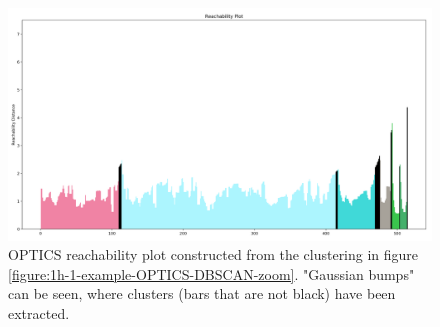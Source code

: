 \begin{figure}[h]
  \centering
  \includegraphics[width=1\textwidth]{./images/OPTICS/1h-1-example-reachabilityPlot-DBSCAN-zoom.png}
  \caption{OPTICS reachability plot constructed from the clustering in figure \ref{figure:1h-1-example-OPTICS-DBSCAN-zoom}. "Gaussian bumps" can be seen, where clusters (bars that are not black) have been extracted.}
  \label{figure:1h-1-example-reachabilityPlot-DBSCAN-zoom}
\end{figure}








